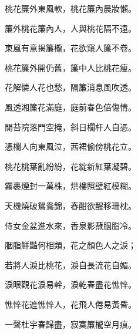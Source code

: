 \begin{poem}
    \begin{pl}桃花簾外東風軟，桃花簾內晨妝懶。\end{pl}

    \begin{pl}簾外桃花簾內人，人與桃花隔不遠。\end{pl}

    \begin{pl}東風有意揭簾櫳，花欲窺人簾不卷。\end{pl}

    \begin{pl}桃花簾外開仍舊，簾中人比桃花瘦。\end{pl}

    \begin{pl}花解憐人花也愁，隔簾消息風吹透。\end{pl}

    \begin{pl}風透湘簾花滿庭，庭前春色倍傷情。\end{pl}

    \begin{pl}閒苔院落門空掩，斜日欄杆人自憑。\end{pl}

    \begin{pl}憑欄人向東風泣，茜裙偷傍桃花立。\end{pl}

    \begin{pl}桃花桃葉亂紛紛，花綻新紅葉凝碧。\end{pl}

    \begin{pl}霧裹煙封一萬株，烘樓照壁紅模糊。\end{pl}

    \begin{pl}天機燒破鴛鴦錦，春酣欲醒移珊枕。\end{pl}

    \begin{pl}侍女金盆進水來，香泉影蘸胭脂冷。\end{pl}

    \begin{pl}胭脂鮮豔何相類，花之顏色人之淚；\end{pl}

    \begin{pl}若將人淚比桃花，淚自長流花自媚。\end{pl}

    \begin{pl}淚眼觀花淚易幹，淚乾春盡花憔悴。\end{pl}

    \begin{pl}憔悴花遮憔悴人，花飛人倦易黃昏。\end{pl}

    \begin{pl}一聲杜宇春歸盡，寂寞簾櫳空月痕。\end{pl}


\end{poem}


